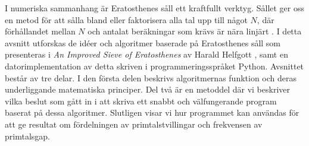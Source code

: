 
I numeriska sammanhang är Eratosthenes såll ett kraftfullt verktyg.
Sållet ger oss en metod för att sålla bland eller faktorisera alla tal upp till något $N$,
där förhållandet mellan $N$ och antalat beräkningar som krävs är nära linjärt \cite[s. 333]{HaraldSieve}.
I detta avsnitt utforskas de idéer och algoritmer baserade på Eratosthenes såll som presenteras i \textit{An Improved Sieve of Eratosthenes} av Harald Helfgott \cite{HaraldSieve}, samt en datorimplementation av detta skriven i programmeringsspråket Python. 
Avsnittet består av tre delar.
I den första delen beskrivs algoritmernas funktion och deras underliggande matematiska principer.
Del två är en metoddel där vi beskriver vilka beslut som gått in i att skriva ett snabbt och välfungerande program baserat på dessa algoritmer.
Slutligen visar vi hur programmet kan användas för att ge resultat om fördelningen av primtalstvillingar och frekvensen av primtalsgap.


